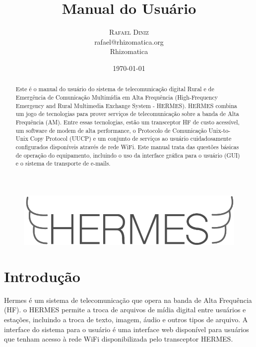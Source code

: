 \documentclass[11pt,a4paper]{article}
\title{Manual do Usuário}
\author{
       \large
        \textsc{Rafael Diniz}
        \mbox{}\\ %
        rafael@rhizomatica.org\\
        \mbox{Rhizomatica} \\ %
}
\date{\today}
\begin{document}
\maketitle

\begin{figure}[!ht]
\includegraphics[width=1\textwidth]{pictures/logoh.png}
\end{figure}

\begin{abstract}

Este é o manual do usuário do sistema de telecomunicação digital Rural e de Emergência de Comunicação Multimídia em Alta Frequência (High-Frequency Emergency and Rural Multimedia Exchange System - HERMES). HERMES combina um jogo de tecnologias para prover serviços de telecomunicação sobre a banda de Alta Frequência (AM). Entre essas tecnologias, estão um transceptor HF de custo acessível, um software de modem de alta performance, o Protocolo de Comunicação Unix-to-Unix Copy Protocol (UUCP) e um conjunto de serviços ao usuário cuidadosamente configurados disponíveis através de rede WiFi. Este manual trata das questões básicas de operação do equipamento, incluindo o uso da interface gráfica para o usuário (GUI) e o sistema de transporte de e-mails.

\end{abstract}

\newpage

\tableofcontents

\setlength{\parindent}{0em}
\setlength{\parskip}{1em}

\section{Introdução}

Hermes é um sistema de telecomunicação que opera na banda de Alta Frequência (HF). o HERMES permite a troca de arquivos de mídia digital entre usuários e estações, incluindo a troca de texto, imagem, áudio e outros tipos de arquivo. A interface do sistema para o usuário é uma interface web disponível para usuários que tenham acesso à rede WiFi disponibilizada pelo transceptor HERMES. 
\end{document}
